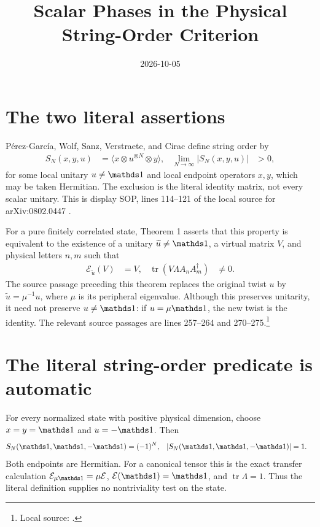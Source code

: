 \documentclass[11pt]{article}
\title{Scalar Phases in the Physical String-Order Criterion}
\author{}
\date{2026-10-05}
\begin{document}
\maketitle

\section{The two literal assertions}

P\'erez-Garc\'ia, Wolf, Sanz, Verstraete, and Cirac define string order by
\begin{align}
 S_N(x,y,u)&=\langle x\otimes u^{\otimes N}\otimes y\rangle,
 &\lim_{N\to\infty}|S_N(x,y,u)|&>0,
 \label{eq:scalar_phase_source_order}
\end{align}
for some local unitary $u\ne\Id$ and local endpoint operators $x,y$, which
may be taken Hermitian. The exclusion is the literal identity matrix,
not every scalar unitary. This is display SOP, lines 114--121 of the local
source for arXiv:0802.0447 \cite{PerezGarcia2008StringOrder}.

For a pure finitely correlated state, Theorem 1 asserts that this property
is equivalent to the existence of a unitary $\widetilde u\ne\Id$, a virtual
matrix $V$, and physical letters $n,m$ such that
\begin{align}
 \mathcal E_{\widetilde u}(V)&=V,
 &\operatorname{tr}(V\Lambda A_n A_m^\dagger)&\ne0.
 \label{eq:scalar_phase_source_fixed}
\end{align}
The source passage preceding this theorem replaces the original twist $u$
by $\widetilde u=\mu^{-1}u$, where $\mu$ is its peripheral eigenvalue.
Although this preserves unitarity, it need not preserve $u\ne\Id$:
if $u=\mu\Id$, the new twist is the identity. The relevant source passages
are lines 257--264 and 270--275.\footnote{Local source:
.}

\section{The literal string-order predicate is automatic}

For every normalized state with positive physical dimension, choose
$x=y=\Id$ and $u=-\Id$. Then
\begin{align}
 S_N(\Id,\Id,-\Id)&=(-1)^N,
 &|S_N(\Id,\Id,-\Id)|&=1.
 \label{eq:scalar_phase_trivial_order}
\end{align}
Both endpoints are Hermitian. For a canonical tensor this is the exact
transfer calculation
$\mathcal E_{\mu\Id}=\mu\mathcal E$,
$\mathcal E(\Id)=\Id$, and $\operatorname{tr}\Lambda=1$.
Thus the literal definition supplies no nontriviality test on the state.
\end{document}
